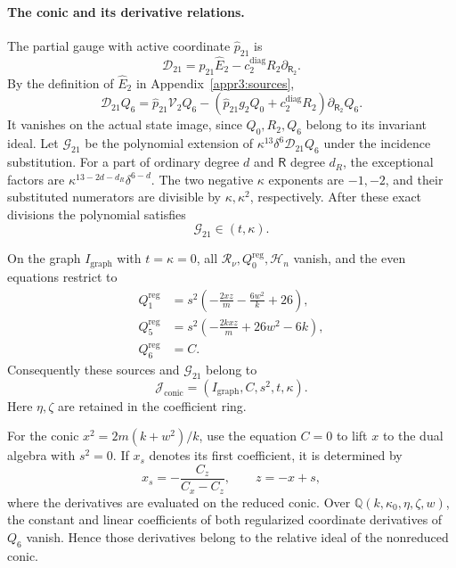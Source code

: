 \documentclass[11pt,a4paper]{article}
\numberwithin{equation}{section}
\theoremstyle{plain}
\theoremstyle{definition}
\theoremstyle{remark}
\begin{document}
\paragraph{The conic and its derivative relations.}
The partial gauge with active coordinate $\widehat p_{21}$ is
\[
 \mathcal D_{21}
   =\widehat p_{21}\widehat E_2
      -c_2^{\mathrm{diag}}R_2\partial_{\mathsf R_2}.
\]
By the definition of $\widehat E_2$ in
Appendix~\ref{appr3:sources},
\[
 \mathcal D_{21}Q_6
 =\widehat p_{21}\mathcal V_2Q_6
  -(\widehat p_{21}g_2Q_0+c_2^{\mathrm{diag}}R_2)
           \partial_{\mathsf R_2}Q_6.
\]
It vanishes on the actual state image, since $Q_0,R_2,Q_6$
belong to its invariant ideal. Let $\mathcal G_{21}$ be the
polynomial extension of $\kappa^{13}\delta^6\mathcal D_{21}Q_6$
under the incidence substitution. For a part of ordinary degree
$d$ and $\mathsf R$ degree $d_R$, the exceptional factors are
$\kappa^{13-2d-d_R}\delta^{6-d}$. The two negative
$\kappa$ exponents are $-1,-2$, and their substituted numerators
are divisible by $\kappa,\kappa^2$, respectively. After these
exact divisions the polynomial satisfies
\[
 \mathcal G_{21}\in(t,\kappa).
\]

On the graph $I_{\mathrm{graph}}$ with $t=\kappa=0$, all
$\mathcal R_\nu,Q_0^{\mathrm{reg}},\mathcal H_n$ vanish, and
the even equations restrict to
\[
 \begin{aligned}
 Q_1^{\mathrm{reg}}&=s^2
       \left(-\frac{2xz}{m}-\frac{6w^2}{k}+26\right),\\
 Q_5^{\mathrm{reg}}&=s^2
       \left(-\frac{2kxz}{m}+26w^2-6k\right),\\
 Q_6^{\mathrm{reg}}&=C.
 \end{aligned}
\]
Consequently these sources and $\mathcal G_{21}$ belong to
\[
 \mathcal J_{\mathrm{conic}}
       =(I_{\mathrm{graph}},C,s^2,t,\kappa).
\]
Here $\eta,\zeta$ are retained in the coefficient ring.

For the conic $x^2=2m(k+w^2)/k$, use the equation $C=0$ to
lift $x$ to the dual algebra with $s^2=0$. If $x_s$ denotes its
first coefficient, it is determined by
\[
 x_s=-\frac{C_z}{C_x-C_z},\qquad z=-x+s,
\]
where the derivatives are evaluated on the reduced conic. Over $\mathbb Q(k,\kappa_0,\eta,\zeta,w)$, the constant and linear
coefficients of both regularized coordinate derivatives of $Q_6$
vanish. Hence those derivatives belong to the relative ideal of
the nonreduced conic.
\end{document}
